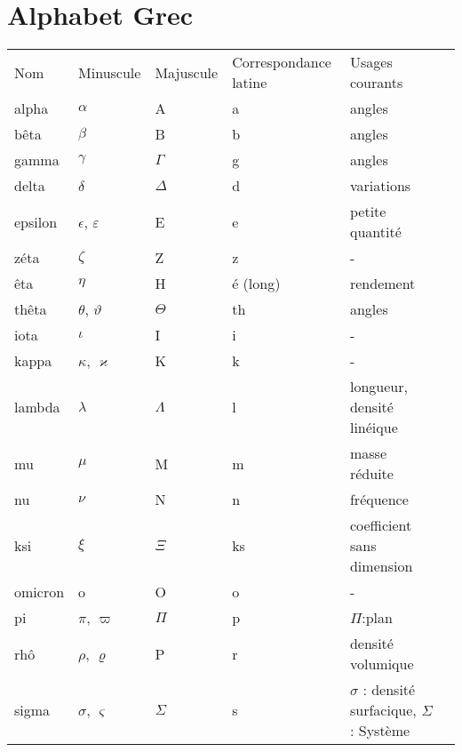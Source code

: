 \addappheadtotoc

\chapter{Alphabet Grec\label{annexe-alpha_grec}}


\begin{table}[!h]
\centering
\begin{tabular}{M{1.75cm}M{1.75cm}M{1.75cm}M{3.75cm}M{3.75cm}N}
    \hhline{=====}
    Nom & Minuscule & Majuscule & Correspondance latine & Usages courants &\\[2em]
    \hhline{=====}
    alpha & $\alpha$ & A & a & angles & \\[0.5em]
    \hline
    bêta  & $\beta$  & B  & b & angles & \\[0.5em]
    \hline
    gamma & $\gamma$ & $\Gamma$ & g & angles & \\[0.5em]
    \hline
    delta & $\delta$ & $\Delta$ & d & variations & \\[0.5em]
    \hline
    epsilon & $\epsilon$, $\varepsilon$ & E & e & petite quantité & \\[0.5em]
    \hline
    zéta & $\zeta$ & Z & z & -  & \\[0.5em]
    \hline
    êta & $\eta$ & H & é (long) & rendement & \\[0.5em]
    \hline
    thêta & $\theta$, $\vartheta$  & $\Theta$ & th & angles & \\[0.5em]
    \hline
    iota & $\iota$ & I & i & - & \\[0.5em]
    \hline
    kappa & $\kappa$, $\varkappa$ & K & k & - & \\[0.5em]
    \hline
    lambda & $\lambda$ & $\Lambda$ & l & longueur, densité linéique & \\[0.5em]
    \hline
    mu & $\mu$ & M & m & masse réduite & \\[0.5em]
    \hline
    nu & $\nu$ & N & n & fréquence & \\[0.5em]
    \hline
    ksi & $\xi$ & $\Xi$ & ks & coefficient sans dimension & \\[0.5em]
    \hline
    omicron & o & O & o & - & \\[0.5em]
    \hline
    pi & $\pi$, $\varpi$ & $\Pi$ & p & $\Pi$:plan & \\[0.5em]
    \hline
    rhô & $\rho$, $\varrho$ & P & r & densité volumique & \\[0.5em]
    \hline
    sigma & $\sigma$, $\varsigma$ & $\Sigma$ & s & $\sigma$ : densité surfacique, $\Sigma$ : Système  & \\[0.5em]

\end{tabular}
\end{table}
